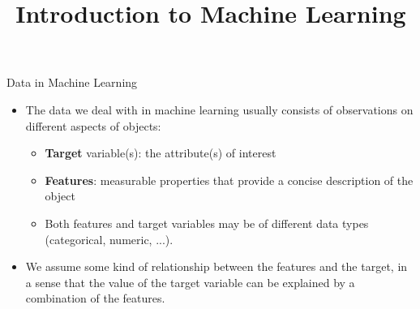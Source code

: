 \documentclass[11pt,compress,t,notes=noshow, xcolor=table]{beamer}
\title{Introduction to Machine Learning}
\institute{\href{https://compstat-lmu.github.io/lecture_i2ml/}{compstat-lmu.github.io/lecture\_i2ml}}
\date{}
\begin{document}









\begin{vbframe}{Data in Machine Learning}

\begin{itemize}

  \item The data we deal with in machine learning usually consists of 
  observations on different aspects of objects:
  
  \begin{itemize}
  
    \item \textbf{Target} variable(s): the attribute(s) of interest

    \item \textbf{Features}: measurable properties that provide a concise 
    description of the object 
    
    \item Both features and target variables may be of different data types 
    (categorical, numeric, ...).

  \end{itemize}
  
  \item We assume some kind of relationship between the features and the target,
  in a sense that the value of the target variable can be explained by a 
  combination of the features.
  


\end{itemize}
\end{vbframe}
\end{document}

